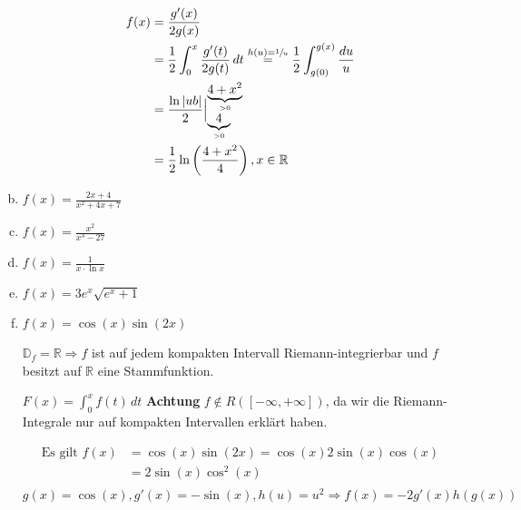 \documentclass{article}
\begin{document}
\begin{enumerate}[a)]
  \begin{align*}
    f(x) &= \frac{g'(x)}{2g(x)} \\
         &= \frac{1}{2} \int_0^x \frac{g'(t)}{2g(t)} \,dt \overset{h(u) = \sfrac{1}{u}}= \frac{1}{2} \int_{g(0)}^{g(x)} \frac{du}{u} \\
         &= \frac{\ln \abs{ub}}{2} {\Big |}_{\underset{> 0}{\underbrace{4}}}^{\underset{> 0}{\underbrace{4 + x^2}}} \\
         &= \frac{1}{2} \ln\left(\frac{4 + x^2}{4}\right), x \in \mathbb{R} \\
  \end{align*}
\item $f(x) = \frac{2x + 4}{x^2 + 4x + 7}$
\item $f(x) = \frac{x^2}{x^3 - 27}$
\item $f(x) = \frac{1}{x \cdot \ln x}$ 
\item $f(x) = 3e^x \sqrt{e^x + 1}$
\item $f(x) = \cos(x) \sin(2x)$

  
  $\mathbb{D}_f = \mathbb{R} \Rightarrow f$ ist auf jedem kompakten Intervall
  Riemann-integrierbar und $f$ besitzt auf $\mathbb{R}$ eine Stammfunktion.

  $F(x) = \int_0^x f(t) \,dt$ \textbf{Achtung} $f \notin R([-\infty, +\infty])$, da wir die
  Riemann-Integrale nur auf kompakten Intervallen erklärt haben.

  \begin{align*}
    \text{Es gilt } f(x) &= \cos (x) \sin (2x) = \cos (x) 2 \sin (x) \cos (x) \\
                         &= 2 \sin (x) \cos^2 (x) \\
  \end{align*}
  $g(x) = \cos(x), g'(x) = - \sin(x), h(u) = u^2 \Rightarrow f(x) = -2 g'(x) h(g(x))$


\end{enumerate}
\end{document}
